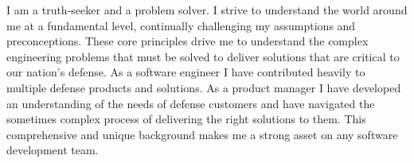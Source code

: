 

\begin{cvparagraph}

I am a truth‑seeker and a problem solver. I strive to understand the world
around me at a fundamental level, continually challenging my assumptions and
preconceptions. These core principles drive me to understand the complex
engineering problems that must be solved to deliver solutions that are critical
to our nation’s defense. As a software engineer I have contributed heavily to
multiple defense products and solutions. As a product manager I have developed
an understanding of the needs of defense customers and have navigated the
sometimes complex process of delivering the right solutions to them. This
comprehensive and unique background makes me a strong asset on any software
development team.
\end{cvparagraph}
